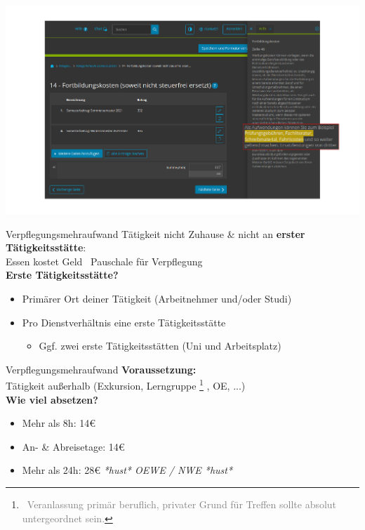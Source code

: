 \documentclass{beamer}
\newcommand{\n}{\hfill\\\vspace{0.25cm}}
\let\oldfootnote\footnote
\renewcommand{\footnote}[1]
{%
	\oldfootnote
	{
		\tiny
		\textcolor{gray}{\ #1}
	}%
}
\begin{document}
			\begin{frame}
				\begin{center}
					\vspace{-0.6cm}
					\hspace*{-0.91cm}
					\includegraphics[scale=0.24]{images/elster-fortbildungskosten-3}
				\end{center}
			\end{frame}
		
			\begin{frame}{Verpflegungsmehraufwand}
				Tätigkeit nicht Zuhause \& nicht an \textbf{erster Tätigkeitsstätte}:\\
				Essen kostet Geld \textrightarrow\ Pauschale für Verpflegung\n
				\textbf{Erste Tätigkeitsstätte?}
				\begin{itemize}
					\item Primärer Ort deiner Tätigkeit (Arbeitnehmer und/oder Studi)
					\item Pro Dienstverhältnis eine erste Tätigkeitsstätte
					\begin{itemize}
						\item Ggf. zwei erste Tätigkeitsstätten (Uni und Arbeitsplatz)
					\end{itemize}
				\end{itemize}
			\end{frame}
				
			\begin{frame}{Verpflegungsmehraufwand}
				\textbf{Voraussetzung:}\\
				Tätigkeit außerhalb (Exkursion, Lerngruppe\footnote{Veranlassung primär beruflich, privater Grund für Treffen sollte absolut untergeordnet sein.}, OE, ...)\n
				\textbf{Wie viel absetzen?}
				\begin{itemize}
					\item Mehr als 8h: 14€
					\item An- \& Abreisetage: 14€
					\item Mehr als 24h: 28€ {\tiny \textit{*hust* OEWE / NWE *hust*}}
				\end{itemize}
			\end{frame}
		
\end{document}
